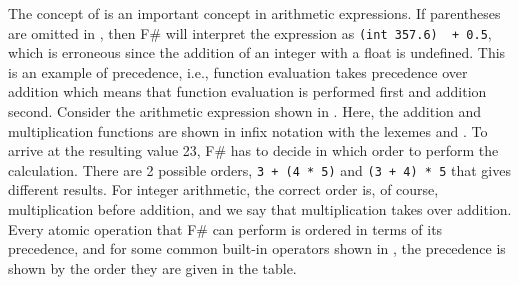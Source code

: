 The concept of  is an important concept in arithmetic expressions. If parentheses are omitted in , then F\# will interpret the expression as \lstinline|(int 357.6)  + 0.5|, which is erroneous since the addition of an integer with a float is undefined. This is an example of precedence, i.e., function evaluation takes precedence over addition which means that function evaluation is performed first and addition second. Consider the arithmetic expression shown in .
%
%
Here, the addition and multiplication functions are shown in infix notation with the  lexemes \lexeme{+} and \lexeme{*}. To arrive at the resulting value 23, F\# has to decide in which order to perform the calculation. There are 2 possible orders, \lstinline|3 + (4 * 5)| and \lstinline|(3 + 4) * 5| that gives different results. For integer arithmetic, the correct order is, of course, multiplication before addition, and we say that multiplication takes  over addition. Every atomic operation that F\# can perform is ordered in terms of its precedence, and for some common built-in operators shown in , the precedence is shown by the order they are given in the table.
